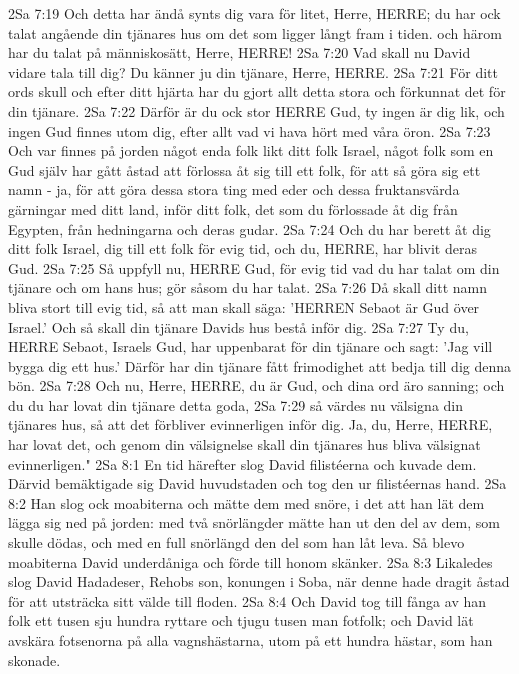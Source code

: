 2Sa 7:19  Och detta har ändå synts dig vara för litet, Herre, HERRE; du har ock talat angående din tjänares hus om det som ligger långt fram i tiden. och härom har du talat på människosätt, Herre, HERRE!
2Sa 7:20  Vad skall nu David vidare tala till dig? Du känner ju din tjänare, Herre, HERRE.
2Sa 7:21  För ditt ords skull och efter ditt hjärta har du gjort allt detta stora och förkunnat det för din tjänare.
2Sa 7:22  Därför är du ock stor HERRE Gud, ty ingen är dig lik, och ingen Gud finnes utom dig, efter allt vad vi hava hört med våra öron.
2Sa 7:23  Och var finnes på jorden något enda folk likt ditt folk Israel, något folk som en Gud själv har gått åstad att förlossa åt sig till ett folk, för att så göra sig ett namn - ja, för att göra dessa stora ting med eder och dessa fruktansvärda gärningar med ditt land, inför ditt folk, det som du förlossade åt dig från Egypten, från hedningarna och deras gudar.
2Sa 7:24  Och du har berett åt dig ditt folk Israel, dig till ett folk för evig tid, och du, HERRE, har blivit deras Gud.
2Sa 7:25  Så uppfyll nu, HERRE Gud, för evig tid vad du har talat om din tjänare och om hans hus; gör såsom du har talat.
2Sa 7:26  Då skall ditt namn bliva stort till evig tid, så att man skall säga: 'HERREN Sebaot är Gud över Israel.' Och så skall din tjänare Davids hus bestå inför dig.
2Sa 7:27  Ty du, HERRE Sebaot, Israels Gud, har uppenbarat för din tjänare och sagt: 'Jag vill bygga dig ett hus.' Därför har din tjänare fått frimodighet att bedja till dig denna bön.
2Sa 7:28  Och nu, Herre, HERRE, du är Gud, och dina ord äro sanning; och du du har lovat din tjänare detta goda,
2Sa 7:29  så värdes nu välsigna din tjänares hus, så att det förbliver evinnerligen inför dig. Ja, du, Herre, HERRE, har lovat det, och genom din välsignelse skall din tjänares hus bliva välsignat evinnerligen."
2Sa 8:1  En tid härefter slog David filistéerna och kuvade dem. Därvid bemäktigade sig David huvudstaden och tog den ur filistéernas hand.
2Sa 8:2  Han slog ock moabiterna och mätte dem med snöre, i det att han lät dem lägga sig ned på jorden: med två snörlängder mätte han ut den del av dem, som skulle dödas, och med en full snörlängd den del som han låt leva. Så blevo moabiterna David underdåniga och förde till honom skänker.
2Sa 8:3  Likaledes slog David Hadadeser, Rehobs son, konungen i Soba, när denne hade dragit åstad för att utsträcka sitt välde till floden.
2Sa 8:4  Och David tog till fånga av han folk ett tusen sju hundra ryttare och tjugu tusen man fotfolk; och David lät avskära fotsenorna på alla vagnshästarna, utom på ett hundra hästar, som han skonade.
